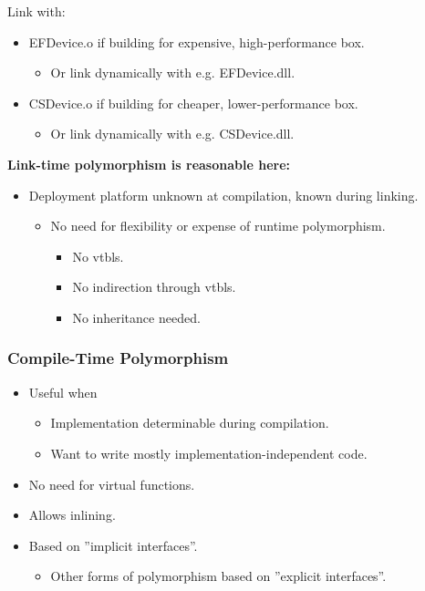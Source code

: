 Link with:
\begin{itemize}
  \item EFDevice.o if building for expensive, high-performance box.
  \begin{itemize}
    \item Or link dynamically with e.g. EFDevice.dll.
  \end{itemize}
  \item CSDevice.o if building for cheaper, lower-performance box.
  \begin{itemize}
    \item Or link dynamically with e.g. CSDevice.dll.
  \end{itemize}
\end{itemize}
\textbf{Link-time polymorphism is reasonable here:}
\begin{itemize}
  \item Deployment platform unknown at compilation, known during linking.
  \begin{itemize}
    \item No need for flexibility or expense of runtime polymorphism.
    \begin{itemize}
      \item No vtbls.
      \item No indirection through vtbls.
      \item No inheritance needed.
    \end{itemize}
  \end{itemize}
\end{itemize}

\subsubsection{Compile-Time Polymorphism}
\begin{itemize}
  \item Useful when
  \begin{itemize}
    \item Implementation determinable during compilation.
    \item Want to write mostly implementation-independent code.
  \end{itemize}
  \item No need for virtual functions.
  \item Allows inlining.
  \item Based on ''implicit interfaces''.
  \begin{itemize}
    \item Other forms of polymorphism based on ''explicit interfaces''.
  \end{itemize}
\end{itemize}

